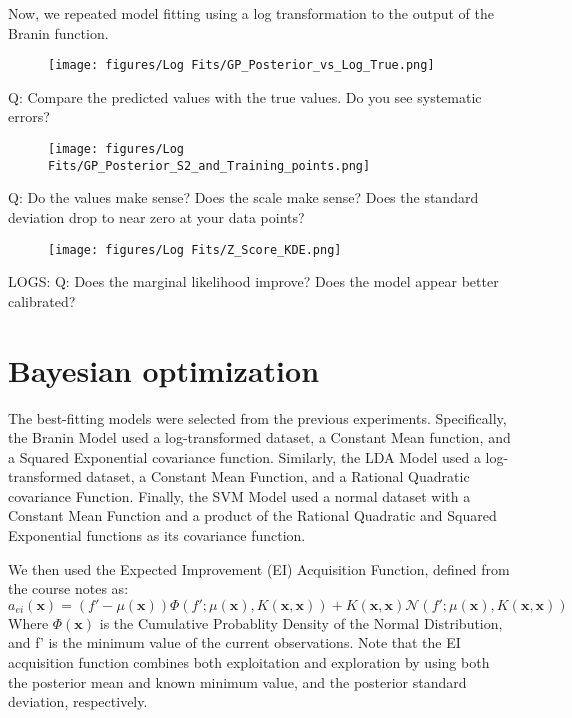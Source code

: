 \documentclass[11pt]{article}
\numberwithin{equation}{section}
\begin{document}
Now, we repeated model fitting using a log transformation to the output of the Branin function.
\begin{figure}[H]
  \centering
  \texttt{[image: figures/Log Fits/GP\_Posterior\_vs\_Log\_True.png]}
  \caption{}
  \label{}
\end{figure}
Q: Compare
the predicted values with the true values. Do you see systematic errors?

\begin{figure}[H]
  \centering
  \texttt{[image: figures/Log Fits/GP\_Posterior\_S2\_and\_Training\_points.png]}
  \caption{}
  \label{}
\end{figure}
Q: Do the values make sense? Does the scale make sense? Does the standard
deviation drop to near zero at your data points?

\begin{figure}[H]
  \centering
  \texttt{[image: figures/Log Fits/Z\_Score\_KDE.png]}
  \caption{}
  \label{}
\end{figure}


LOGS:
Q:  Does the
marginal likelihood improve? Does the model appear better calibrated?

\section*{Bayesian optimization}

The best-fitting models were selected from the previous experiments. 
Specifically, the Branin Model used a log-transformed dataset, a Constant Mean function, and a Squared Exponential covariance function.
Similarly, the LDA Model used a log-transformed dataset, a Constant Mean Function, and a Rational Quadratic covariance Function.
Finally, the SVM Model used a normal dataset with a Constant Mean Function and a product of the Rational Quadratic and Squared Exponential functions as its covariance function.

We then used the Expected Improvement (EI) Acquisition Function, defined from the course notes as:
\begin{equation}
  a_{ei}(\bm{x}) = (f' - \mu(\bm{x}))\Phi(f';\mu(\bm{x}),K(\bm{x},\bm{x})) + K(\bm{x},\bm{x})\mathcal{N}(f';\mu(\bm{x}),K(\bm{x},\bm{x}))
  \label{eq:Expected Improvement}
\end{equation}
Where $\Phi(\bm{x})$ is the Cumulative Probablity Density of the Normal Distribution, and f' is the minimum value of the current observations.
Note that the EI acquisition function combines both exploitation and exploration by using both the posterior mean and known minimum value, and the posterior standard deviation, respectively. 
\end{document}
